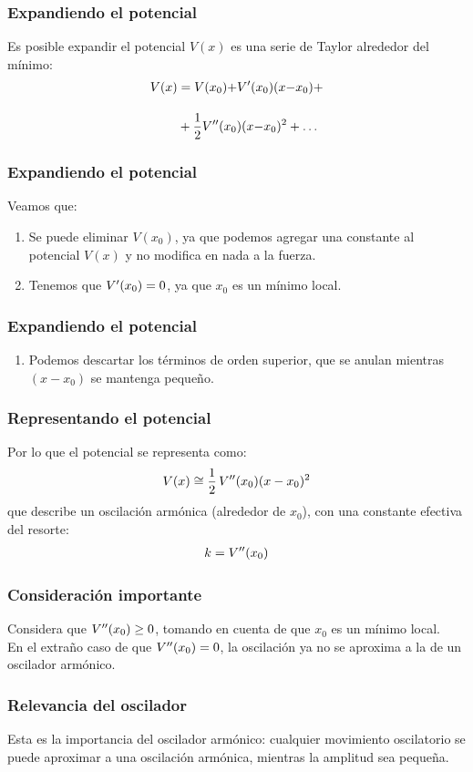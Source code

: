 \documentclass[12pt]{beamer}
\begin{document}
\begin{frame}
\frametitle{Expandiendo el potencial}
Es posible expandir el potencial $V(x)$ es una serie de Taylor alrededor del mínimo:
\pause
\begin{align*}
V (x) &= V (x_{0}) {+} {V}^{\prime} (x_{0}) (x {-} x_{0}) + \\[1em]
&+ \dfrac{1}{2} {V}^{\prime \prime} (x_{0}) (x {-} x_{0})^{2} + \ldots
\end{align*}
\end{frame}
\begin{frame}
\frametitle{Expandiendo el potencial}
Veamos que:
\pause
{}
\begin{enumerate}[<+->]
\item Se puede eliminar $V(x_{0})$, ya que podemos agregar una constante al potencial $V(x)$ y no modifica en nada a la fuerza.
\item Tenemos que ${V}^{\prime} (x_{0}) = 0$, ya que $x_{0}$ es un mínimo local.
\seti
\end{enumerate}
\end{frame}
\begin{frame}
\frametitle{Expandiendo el potencial}
\begin{enumerate}
\conti
\item Podemos descartar los términos de orden superior, que se anulan mientras $(x - x_{0})$ se mantenga pequeño.
\end{enumerate}
\end{frame}
\begin{frame}
\frametitle{Representando el potencial}
Por lo que el potencial se representa como:
\pause
\begin{align*}
V (x) \cong \dfrac{1}{2} \, {V}^{\prime \prime} (x_{0}) (x - x_{0})^{2}
\end{align*}
\pause
que describe un oscilación armónica (alrededor de $x_{0}$), con una constante efectiva del resorte:
\begin{align*}
k = {V}^{\prime \prime} (x_{0})
\end{align*}
\end{frame}
\begin{frame}
\frametitle{Consideración importante}
Considera que ${V}^{\prime \prime} (x_{0})\geq 0$, \pause tomando en cuenta de que $x_{0}$ es un mínimo local.
\\
\bigskip
\pause
En el extraño caso de que ${V}^{\prime \prime} (x_{0})= 0$, \pause la oscilación ya no se aproxima a la de un oscilador armónico.
\end{frame}
\begin{frame}
\frametitle{Relevancia del oscilador}
Esta es la importancia del oscilador armónico: \pause cualquier movimiento oscilatorio se puede aproximar a una oscilación armónica, mientras la amplitud sea pequeña.
\end{frame}
\end{document}
